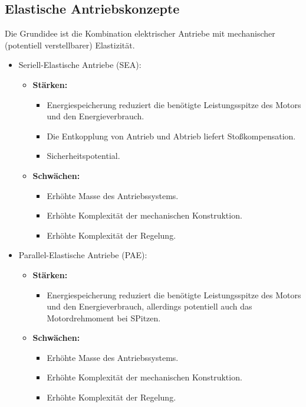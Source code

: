 		\subsection{Elastische Antriebskonzepte} %
			Die Grundidee ist die Kombination elektrischer Antriebe mit mechanischer (potentiell verstellbarer) Elastizität.
			
			\begin{itemize}
				\item Seriell-Elastische Antriebe (SEA):
					\begin{itemize}
						\item \textbf{Stärken:}
							\begin{itemize}
								\item Energiespeicherung reduziert die benötigte Leistungsspitze des Motors und den Energieverbrauch.
								\item Die Entkopplung von Antrieb und Abtrieb liefert Stoßkompensation.
								\item Sicherheitspotential.
							\end{itemize}
						\item \textbf{Schwächen:}
							\begin{itemize}
								\item Erhöhte Masse des Antriebssystems.
								\item Erhöhte Komplexität der mechanischen Konstruktion.
								\item Erhöhte Komplexität der Regelung.
							\end{itemize}
					\end{itemize}
				\item Parallel-Elastische Antriebe (PAE):
					\begin{itemize}
						\item \textbf{Stärken:}
							\begin{itemize}
								\item Energiespeicherung reduziert die benötigte Leistungsspitze des Motors und den Energieverbrauch, allerdings potentiell auch das Motordrehmoment bei SPitzen.
							\end{itemize}
						\item \textbf{Schwächen:}
							\begin{itemize}
								\item Erhöhte Masse des Antriebssystems.
								\item Erhöhte Komplexität der mechanischen Konstruktion.
								\item Erhöhte Komplexität der Regelung.
							\end{itemize}
					\end{itemize}
			\end{itemize}


